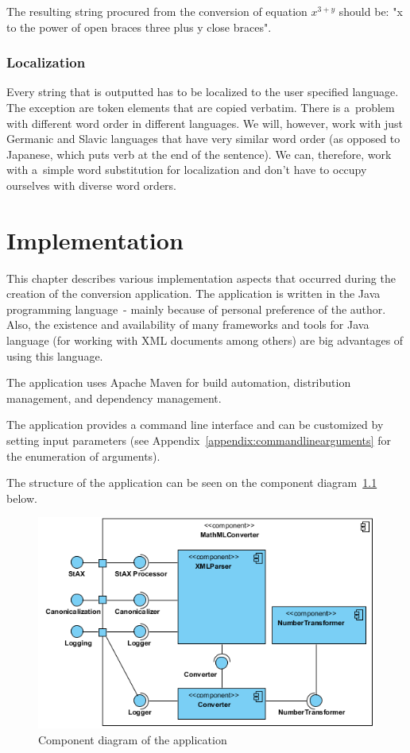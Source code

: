 \documentclass[11pt,oneside,final]{fithesis2}
\def\s#1{#1\index{#1}}
\begin{document}
The resulting string procured from the conversion of equation $x^{3+y}$ should be: "x to the power of open braces three plus y close braces".

\subsection{Localization}
Every string  that is outputted has to be localized to the user specified language. The exception are token elements that are copied verbatim. There is a~problem with different word order in different languages. We will, however, work with just Germanic and Slavic languages that have very similar word order (as opposed to Japanese, which puts verb at the end of the sentence). We can, therefore, work with a~simple word substitution for localization and don't have to occupy ourselves with diverse word orders.

\chapter{Implementation}
\label{chapter:implementation}
This chapter describes various implementation aspects that occurred during the creation of the conversion application. The application is written in the \s{Java} programming language~- mainly because of personal preference of the author. Also, the existence and availability of many frameworks and tools for Java language (for working with XML documents among others) are big advantages of using this language. 

The application uses Apache Maven for build automation, distribution management, and dependency management.

The application provides a command line interface and can be customized by setting input parameters (see Appendix~\ref{appendix:commandlinearguments} for the enumeration of arguments).

The structure of the application can be seen on the component diagram~\ref{fig:componentdiagram} below.

\begin{figure}[!ht]
\centering
\includegraphics[width=\textwidth]{component_diagram}
\caption{Component diagram of the application}
\label{fig:componentdiagram}
\end{figure}
\end{document}
